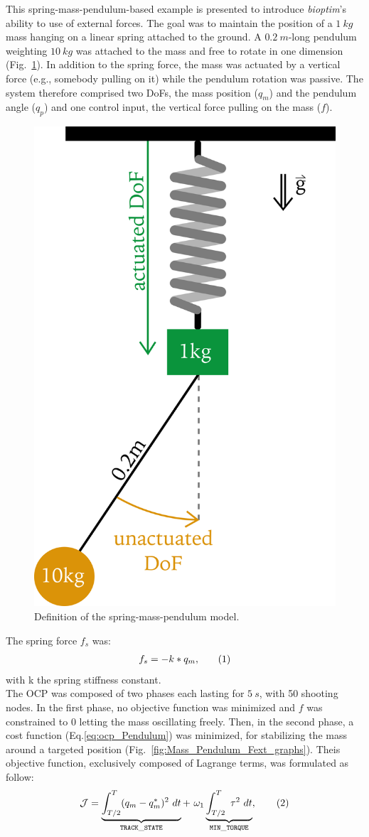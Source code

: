 This spring-mass-pendulum-based example is presented to introduce \textit{bioptim}'s ability to use of external forces.
The goal was to maintain the position of a $\SI{1}{kg}$ mass hanging on a linear spring attached to the ground.
A $\SI{0.2}{m}$-long pendulum weighting $\SI{10}{kg}$ was attached to the mass and free to rotate in one dimension (Fig.~\ref{fig:Mass_Pendulum_Model}).
In addition to the spring force, the mass was actuated by a vertical force (e.g., somebody pulling on it) while the pendulum rotation was passive.
The system therefore comprised two DoFs, the mass position ($q_m$) and the pendulum angle ($q_p$) and one control input, the vertical force pulling on the mass ($f$). 
\begin{figure}[h!]
\centering
\includegraphics[width=0.35\columnwidth]{figures/Mass_Pendulum_Model.png}
\caption{Definition of the spring-mass-pendulum model.}
\label{fig:Mass_Pendulum_Model}
\end{figure}
The spring force $f_s$ was:
\[
\begin{aligned}
f_s = -k*q_m,
\end{aligned}
\addtag
\label{eq:f_ext}
\]
with k the spring stiffness constant.\\
The OCP was composed of two phases each lasting for $\SI{5}{s}$, with 50 shooting nodes.
In the first phase, no objective function was minimized and $f$ was constrained to $0$ letting the mass oscillating freely. 
Then, in the second phase, a cost function (Eq.\ref{eq:ocp_Pendulum}) was minimized, for stabilizing the mass around a targeted position (Fig.~\ref{fig:Mass_Pendulum_Fext_graphs}).
Theis objective function, exclusively composed of Lagrange terms, was formulated as follow:
\[
\mathcal{J} = \underbrace{\int_{T/2}^T (q_m - q_m^*)^2~dt}_{\mathtt{TRACK\_STATE}}  +~\omega_1 \underbrace{\int_{T/2}^T ~\tau^2~dt}_{\mathtt{MIN\_ TORQUE}},
\addtag
\label{eq:ocp_Pendulum}
\]

